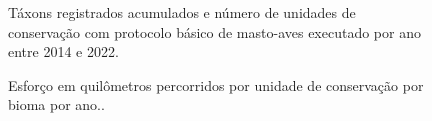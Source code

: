 \documentclass[
  letterpaper,
]{scrbook}
\begin{document}
\begin{figure}[H]


\caption{\label{fig-taxons-acumulados}Táxons registrados acumulados e
número de unidades de conservação com protocolo básico de masto-aves
executado por ano entre 2014 e 2022.}

\end{figure}%

\begin{figure}


\caption{\label{fig-esforco-total-uc-bioma}Esforço em quilômetros
percorridos por unidade de conservação por bioma por ano..}

\end{figure}%
\end{document}
